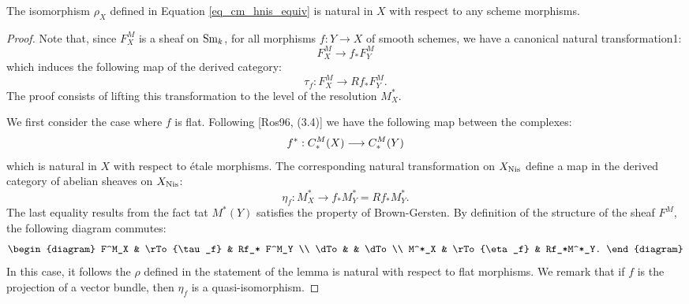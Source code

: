 \begin{lem}\label{lem_cm_hnis_equiv_morph}
The isomorphism $\rho_X$ defined in Equation 
\ref{eq_cm_hnis_equiv} is natural in $X$ with respect to any
scheme morphisms.
\end{lem}
\begin{proof}
Note that, since $F^M_X$ is a sheaf on $\mathrm{Sm}_{k}$, for all 
morphisms $f: Y \to X$ of smooth schemes, we have a canonical
natural transformation1:
\[
F^M_X \to f_*F^M_Y
\]
which induces the following map of the derived category:
\[
\tau_f: F^M_X \to Rf_*F^M_Y.
\]
The proof consists of lifting this transformation to the level
of the resolution $M^*_X$.

We first consider the case where $f$ is flat. Following 
[Ros96, (3.4)] we have the following map between the complexes:
\[
f^*: C_*^{M}(X) \longrightarrow C_*^{M}(Y)
\]
which is natural in $X$ with respect to \'etale morphisms. The
corresponding natural transformation on $X_{\mathrm{Nis}}$ define a map
in the derived category of abelian sheaves on $X_{\mathrm{Nis}}$:
\begin{equation}\label{eq_3_3_a}
\eta_f: M^*_X \to f_*M^*_Y = Rf_*M^*_Y.
\end{equation}
The last equality results from the fact tat $M^*(Y)$ satisfies
the property of Brown-Gersten. By definition of the structure of
the sheaf $F^M$, the following diagram commutes:
\[
\begin{diagram}
F^M_X  & \rTo{\tau_f} & Rf_* F^M_Y \\
\dTo   &              & \dTo       \\
M^*_X & \rTo{\eta_f} & Rf_*M^*_Y.
\end{diagram}
\]
In this case, it follows the $\rho$ defined in the statement of
the lemma is natural with respect to flat morphisms. We remark
that if $f$ is the projection of a vector bundle, then $\eta_f$
is a quasi-isomorphism.


\end{proof}
